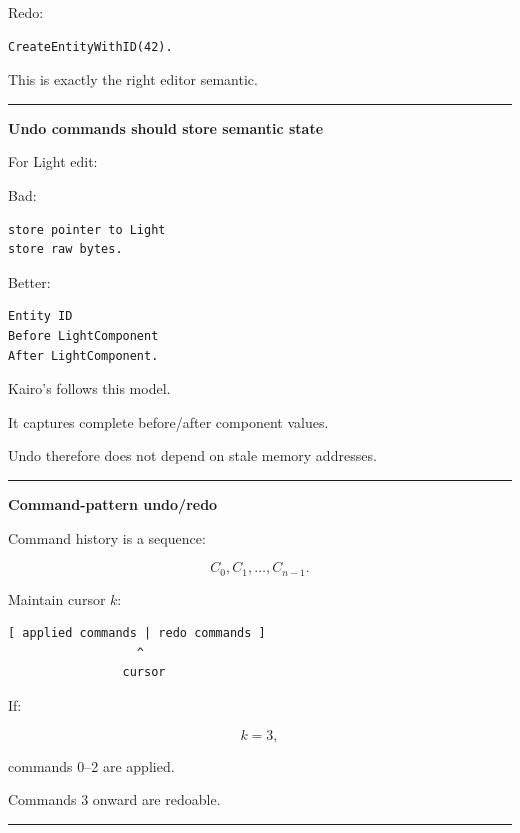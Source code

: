 Redo:

\begin{verbatim}
CreateEntityWithID(42).
\end{verbatim}

This is exactly the right editor semantic.

\begin{center}\rule{0.5\linewidth}{0.5pt}\end{center}

\textbf{Undo commands should store semantic state}

For Light edit:

Bad:

\begin{verbatim}
store pointer to Light
store raw bytes.
\end{verbatim}

Better:

\begin{verbatim}
Entity ID
Before LightComponent
After LightComponent.
\end{verbatim}

Kairo's  follows this model.

It captures complete before/after component values.

Undo therefore does not depend on stale memory addresses.

\begin{center}\rule{0.5\linewidth}{0.5pt}\end{center}

\textbf{Command-pattern undo/redo}

Command history is a sequence:

\[
C_0,C_1,\dots,C_{n-1}.
\]

Maintain cursor \(k\):

\begin{verbatim}
[ applied commands | redo commands ]
                  ^
                cursor
\end{verbatim}

If:

\[
k=3,
\]

commands 0--2 are applied.

Commands 3 onward are redoable.

\begin{center}\rule{0.5\linewidth}{0.5pt}\end{center}

